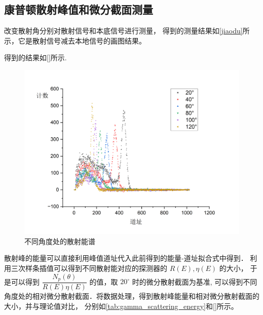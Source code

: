 \documentclass[font=default]{mpltx}
\begin{document}
    \subsection{康普顿散射峰值和微分截面测量}

    改变散射角分别对散射信号和本底信号进行测量， 得到的测量结果如\autoref{jiaodu}所示，它是散射信号减去本地信号的画图结果。
    
    得到的结果如\autoref{}所示.

      \begin{figure}[htbp]
        \centering
        \includegraphics[width=0.85\linewidth]{fig/jiaodu.png}
        \caption{不同角度处的散射能谱}
        \label{fig:jiaodu}
      \end{figure}
      散射峰的能量可以直接利用峰值道址代入此前得到的能量-道址拟合式中得到．
      利用三次样条插值可以得到不同散射能对应的探测器的 $R(E), \eta(E)$ 的大小，
      于是可以得到 $\dfrac{N_p(\theta)}{R(E)\eta(E)}$ 的值，取 $20^\circ$ 时的微分散射截面为基准,
      可以得到不同角度处的相对微分散射截面．将数据处理，得到散射峰能量和相对微分散射截面的大小，并与理论值对比，
      分别如\autoref{tab:gamma_scattering_energy}和\autoref{}所示。
\end{document}
